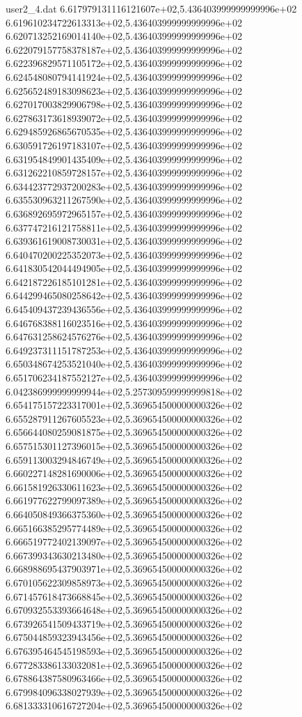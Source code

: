 \begin{filecontents}{user2_4.dat}
6.617979131116121607e+02,5.436403999999999996e+02
6.619610234722613313e+02,5.436403999999999996e+02
6.620713252169014140e+02,5.436403999999999996e+02
6.622079157758378187e+02,5.436403999999999996e+02
6.622396829571105172e+02,5.436403999999999996e+02
6.624548080794141924e+02,5.436403999999999996e+02
6.625652489183098623e+02,5.436403999999999996e+02
6.627017003829906798e+02,5.436403999999999996e+02
6.627863173618939072e+02,5.436403999999999996e+02
6.629485926865670535e+02,5.436403999999999996e+02
6.630591726197183107e+02,5.436403999999999996e+02
6.631954849901435409e+02,5.436403999999999996e+02
6.631262210859728157e+02,5.436403999999999996e+02
6.634423772937200283e+02,5.436403999999999996e+02
6.635530963211267590e+02,5.436403999999999996e+02
6.636892695972965157e+02,5.436403999999999996e+02
6.637747216121758811e+02,5.436403999999999996e+02
6.639361619008730031e+02,5.436403999999999996e+02
6.640470200225352073e+02,5.436403999999999996e+02
6.641830542044494905e+02,5.436403999999999996e+02
6.642187226185101281e+02,5.436403999999999996e+02
6.644299465080258642e+02,5.436403999999999996e+02
6.645409437239436556e+02,5.436403999999999996e+02
6.646768388116023516e+02,5.436403999999999996e+02
6.647631258624576276e+02,5.436403999999999996e+02
6.649237311151787253e+02,5.436403999999999996e+02
6.650348674253521040e+02,5.436403999999999996e+02
6.651706234187552127e+02,5.436403999999999996e+02
6.042386999999999944e+02,5.257309599999999818e+02
6.654175157223317001e+02,5.369654500000000326e+02
6.655287911267605523e+02,5.369654500000000326e+02
6.656644080259081875e+02,5.369654500000000326e+02
6.657515301127396015e+02,5.369654500000000326e+02
6.659113003294846749e+02,5.369654500000000326e+02
6.660227148281690006e+02,5.369654500000000326e+02
6.661581926330611623e+02,5.369654500000000326e+02
6.661977622799097389e+02,5.369654500000000326e+02
6.664050849366375360e+02,5.369654500000000326e+02
6.665166385295774489e+02,5.369654500000000326e+02
6.666519772402139097e+02,5.369654500000000326e+02
6.667399343630213480e+02,5.369654500000000326e+02
6.668988695437903971e+02,5.369654500000000326e+02
6.670105622309858973e+02,5.369654500000000326e+02
6.671457618473668845e+02,5.369654500000000326e+02
6.670932553393664648e+02,5.369654500000000326e+02
6.673926541509433719e+02,5.369654500000000326e+02
6.675044859323943456e+02,5.369654500000000326e+02
6.676395464545198593e+02,5.369654500000000326e+02
6.677283386133032081e+02,5.369654500000000326e+02
6.678864387580963466e+02,5.369654500000000326e+02
6.679984096338027939e+02,5.369654500000000326e+02
6.681333310616727204e+02,5.369654500000000326e+02

\end{filecontents}
